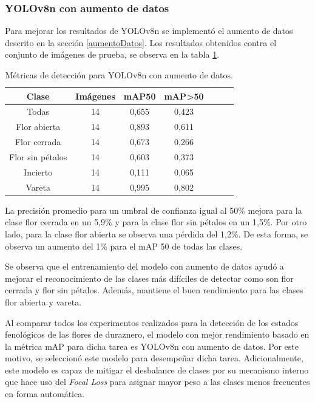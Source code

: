 \subsubsection{YOLOv8n con aumento de datos}
\label{YOLOv8n con aumento de dato}

Para mejorar los resultados de YOLOv8n se implementó el aumento de datos descrito en la sección \ref{aumentoDatos}. Los resultados obtenidos contra el conjunto de imágenes de prueba, se observa en la tabla \ref{tab:resultadosYoloConAug}.

\begin{table}[h]
	\centering
	\caption{Métricas de detección para YOLOv8n con aumento de datos.}
	\begin{tabular}{c c c c c c c}    
		\toprule
		\textbf{Clase}&\textbf{Imágenes}&\textbf{mAP50}&\textbf{mAP>50}\\
		\midrule
		Todas & 14 & 0,655 & 0,423\\
		Flor abierta & 14 & 0,893 & 0,611 \\
		Flor cerrada & 14 & 0,673 & 0,266 \\
		Flor sin pétalos & 14 & 0,603 & 0,373 \\
		Incierto & 14 & 0,111 & 0,065 \\
		Vareta & 14 & 0,995 & 0,802 \\		
		\bottomrule
		\hline
	\end{tabular}
	\label{tab:resultadosYoloConAug}
\end{table}

La precisión promedio para un umbral de confianza igual al 50\% mejora para la clase flor cerrada en un 5,9\% y para la clase flor sin pétalos en un 1,5\%. Por otro lado, para la clase flor abierta se observa una pérdida del 1,2\%. De esta forma, se observa un aumento del 1\% para el mAP 50 de todas las clases.

Se observa que el entrenamiento del modelo con aumento de datos ayudó a mejorar el reconocimiento de las clases más difíciles de detectar como son flor cerrada y flor sin pétalos. Además, mantiene el buen rendimiento para las clases flor abierta y vareta.

Al comparar todos los experimentos realizados para la detección de los estados fenológicos de las flores de duraznero, el modelo con mejor rendimiento basado en la métrica mAP para dicha tarea es YOLOv8n con aumento de datos. Por este motivo, se seleccionó este modelo para desempeñar dicha tarea. Adicionalmente, este modelo es capaz de mitigar el desbalance de clases por su mecanismo interno que hace uso del \textit{Focal Loss} \cite{ARTICLE:15} para asignar mayor peso a las clases menos frecuentes en forma automática. 

